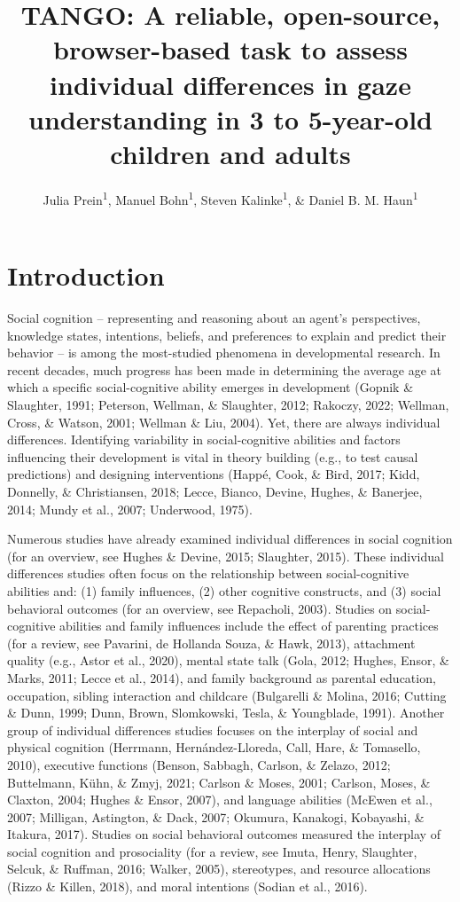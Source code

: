 \documentclass[
  man,floatsintext]{apa6}
\title{TANGO: A reliable, open-source, browser-based task to assess individual differences in gaze understanding in 3 to 5-year-old children and adults}
\author{Julia Prein\textsuperscript{1}, Manuel Bohn\textsuperscript{1}, Steven Kalinke\textsuperscript{1}, \& Daniel B. M. Haun\textsuperscript{1}}
\date{}
\affiliation{\vspace{0.5cm}\textsuperscript{1} Department of Comparative Cultural Psychology, Max Planck Institute for Evolutionary Anthropology, Leipzig, Germany}
\begin{document}
\maketitle

\hypertarget{introduction}{%
\section{Introduction}\label{introduction}}

Social cognition -- representing and reasoning about an agent's perspectives, knowledge states, intentions, beliefs, and preferences to explain and predict their behavior -- is among the most-studied phenomena in developmental research.
In recent decades, much progress has been made in determining the average age at which a specific social-cognitive ability emerges in development (Gopnik \& Slaughter, 1991; Peterson, Wellman, \& Slaughter, 2012; Rakoczy, 2022; Wellman, Cross, \& Watson, 2001; Wellman \& Liu, 2004). Yet, there are always individual differences. Identifying variability in social-cognitive abilities and factors influencing their development is vital in theory building (e.g., to test causal predictions) and designing interventions (Happé, Cook, \& Bird, 2017; Kidd, Donnelly, \& Christiansen, 2018; Lecce, Bianco, Devine, Hughes, \& Banerjee, 2014; Mundy et al., 2007; Underwood, 1975).

Numerous studies have already examined individual differences in social cognition (for an overview, see Hughes \& Devine, 2015; Slaughter, 2015). These individual differences studies often focus on the relationship between social-cognitive abilities and: (1) family influences, (2) other cognitive constructs, and (3) social behavioral outcomes (for an overview, see Repacholi, 2003). Studies on social-cognitive abilities and family influences include the effect of parenting practices (for a review, see Pavarini, de Hollanda Souza, \& Hawk, 2013), attachment quality (e.g., Astor et al., 2020), mental state talk (Gola, 2012; Hughes, Ensor, \& Marks, 2011; Lecce et al., 2014), and family background as parental education, occupation, sibling interaction and childcare (Bulgarelli \& Molina, 2016; Cutting \& Dunn, 1999; Dunn, Brown, Slomkowski, Tesla, \& Youngblade, 1991). Another group of individual differences studies focuses on the interplay of social and physical cognition (Herrmann, Hernández-Lloreda, Call, Hare, \& Tomasello, 2010), executive functions (Benson, Sabbagh, Carlson, \& Zelazo, 2012; Buttelmann, Kühn, \& Zmyj, 2021; Carlson \& Moses, 2001; Carlson, Moses, \& Claxton, 2004; Hughes \& Ensor, 2007), and language abilities (McEwen et al., 2007; Milligan, Astington, \& Dack, 2007; Okumura, Kanakogi, Kobayashi, \& Itakura, 2017). Studies on social behavioral outcomes measured the interplay of social cognition and prosociality (for a review, see Imuta, Henry, Slaughter, Selcuk, \& Ruffman, 2016; Walker, 2005), stereotypes, and resource allocations (Rizzo \& Killen, 2018), and moral intentions (Sodian et al., 2016).
\end{document}
